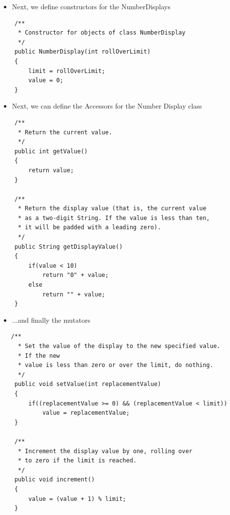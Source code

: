 \documentclass{beamer}
\begin{document}
\begin{frame}[fragile]

\begin{itemize}
\item Next, we define constructors for the NumberDisplays
\end{itemize}

\begin{block}{}
\begin{lstlisting}
    /**
     * Constructor for objects of class NumberDisplay
     */
    public NumberDisplay(int rollOverLimit)
    {
        limit = rollOverLimit;
        value = 0;
    }
\end{lstlisting}
\end{block}

\end{frame}
\begin{frame}[fragile]

\begin{itemize}
\item Next, we can define the Accessors for the Number Display class
\end{itemize}

\scriptsize
\begin{block}{}
\begin{lstlisting}
    /**
     * Return the current value.
     */
    public int getValue()
    {
        return value;
    }

    /**
     * Return the display value (that is, the current value 
     * as a two-digit String. If the value is less than ten, 
     * it will be padded with a leading zero).
     */
    public String getDisplayValue()
    {
        if(value < 10)
            return "0" + value;
        else
            return "" + value;
    }
\end{lstlisting}
\end{block}

\end{frame}

\begin{frame}[fragile]

\begin{itemize}
\item ...and finally the mutators
\end{itemize}

\scriptsize
\begin{block}{}
\begin{lstlisting}
   /**
     * Set the value of the display to the new specified value. 
     * If the new
     * value is less than zero or over the limit, do nothing.
     */
    public void setValue(int replacementValue)
    {
        if((replacementValue >= 0) && (replacementValue < limit))
            value = replacementValue;
    }

    /**
     * Increment the display value by one, rolling over 
     * to zero if the limit is reached.
     */
    public void increment()
    {
        value = (value + 1) % limit;
    }

\end{lstlisting}
\end{block}

\end{frame}
\end{document}
